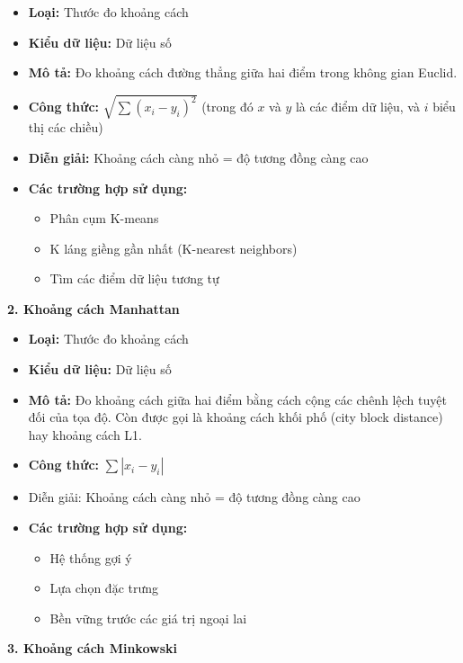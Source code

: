 \begin{itemize}
  \item \textbf{Loại:} Thước đo khoảng cách
  \item \textbf{Kiểu dữ liệu:} Dữ liệu số
  \item \textbf{Mô tả:} Đo khoảng cách đường thẳng giữa hai điểm trong không gian Euclid.
  \item \textbf{Công thức:} $\sqrt{\sum (x_i - y_i)^2}$ (trong đó $x$ và $y$ là các điểm dữ liệu, và $i$ biểu thị các chiều)
  \item \textbf{Diễn giải:} Khoảng cách càng nhỏ = độ tương đồng càng cao
  \item \textbf{Các trường hợp sử dụng:}
  \begin{itemize}
    \item Phân cụm K-means
    \item K láng giềng gần nhất (K-nearest neighbors)
    \item Tìm các điểm dữ liệu tương tự
  \end{itemize}
\end{itemize}

\textbf{2. Khoảng cách Manhattan}

\begin{itemize}
  \item \textbf{Loại:} Thước đo khoảng cách
  \item \textbf{Kiểu dữ liệu:} Dữ liệu số
  \item \textbf{Mô tả:} Đo khoảng cách giữa hai điểm bằng cách cộng các chênh lệch tuyệt đối của tọa độ. Còn được gọi là khoảng cách khối phố (city block distance) hay khoảng cách L1.
  \item \textbf{Công thức:} $\sum |x_i - y_i|$
  \item Diễn giải: Khoảng cách càng nhỏ = độ tương đồng càng cao
  \item \textbf{Các trường hợp sử dụng:}
  \begin{itemize}
    \item Hệ thống gợi ý
    \item Lựa chọn đặc trưng
    \item Bền vững trước các giá trị ngoại lai
  \end{itemize}
\end{itemize}

\textbf{3. Khoảng cách Minkowski}

